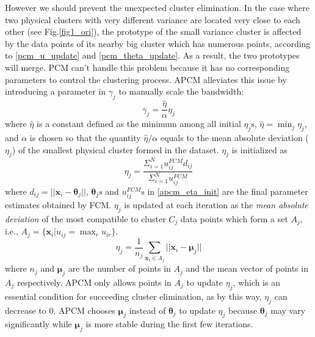 \documentclass[journal,transmag]{IEEEtran}
\begin{document}
However we should prevent the unexpected cluster elimination. In the case where two physical clusters with very different variance are located very close to each other (see Fig.\ref{fig1_ori}), the prototype of the small variance cluster is affected by the data points of its nearby big cluster which has numerous points, according to \eqref{pcm_u_update} and \eqref{pcm_theta_update}. As a result, the two prototypes will merge. PCM can't handle this problem because it has no corresponding parameters to control the clustering process. APCM alleviates this issue by introducing a parameter in $\gamma_j$ to manually scale the bandwidth:
\begin{equation}
\label{corrected_eta}
\gamma_j=\frac{\hat{\eta}}{\alpha}\eta_j
\end{equation}
where $\hat{\eta}$ is a constant defined as the minimum among all initial $\eta_j\text{s}$, $\hat{\eta}=\min_j\eta_j$, and $\alpha$ is chosen so that the quantity $\hat{\eta}/\alpha$ equals to the mean absolute deviation ($\eta_j$)  of the smallest physical cluster formed in the dataset. $\eta_j$ is initialized as
\begin{equation}
\label{apcm_eta_init}
\eta_j=\frac{\Sigma_{i=1}^Nu_{ij}^{FCM}d_{ij}}{\Sigma_{i=1}^Nu_{ij}^{FCM}}
\end{equation}
where $d_{ij}=||\mathbf{x}_i-\boldsymbol{\theta}_j||$, $\boldsymbol{\theta}_j\text{s}$ and $u_{ij}^{FCM}\text{s}$ in \eqref{apcm_eta_init} are the final parameter estimates obtained by FCM. $\eta_j$ is updated at each iteration as the \emph{mean absolute deviation} of the most compatible to cluster $C_j$ data points which form a set $A_j$, i.e., $A_j=\{\mathbf{x}_i|u_{ij}=\max_r u_{ir}\}$.
\begin{equation}
\label{apcm_eta_update}
\eta_j=\frac{1}{n_j}\sum_{\mathbf{x}_i\in A_j}||\mathbf{x}_i-\boldsymbol{\mu}_j||
\end{equation}
where $n_j$ and $\boldsymbol{\mu}_j$ are the number of points in $A_j$ and the mean vector of points in $A_j$ respectively. APCM only allows points in $A_j$ to update $\eta_j$, which is an essential condition for succeeding cluster elimination, as by this way, $\eta_j$ can decrease to $0$. APCM chooses $\boldsymbol{\mu}_j$ instead of $\boldsymbol{\theta}_j$ to update $\eta_j$ because $\boldsymbol{\theta}_j$ may vary significantly while $\boldsymbol{\mu}_j$ is more stable during the first few iterations.
\end{document}
